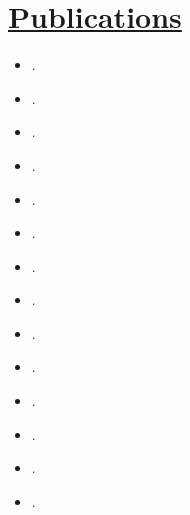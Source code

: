 \documentclass[11pt]{article}
\begin{document}

\section*{\underline{Publications}}
\begin{itemize}
\item[\cite{street2025planning}] .
\item[\cite{zhang2025robots}] .
\item[\cite{zhang2025multi}] .
\item[\cite{street2024towards}] .
\item[\cite{street2024covered}] .
\item[\cite{zhang2024decoupled}] .
\item[\cite{street2024right}] .
\item[\cite{street2023formal}] .
\item[\cite{zhang2023multi}] .
\item[\cite{street2023analysing}] .
\item[\cite{lacerda2022decision}] .
\item[\cite{street2022context}] .
\item[\cite{street2021congestion}] .	
\item[\cite{street2020multi}] .
\end{itemize}
\end{document}

